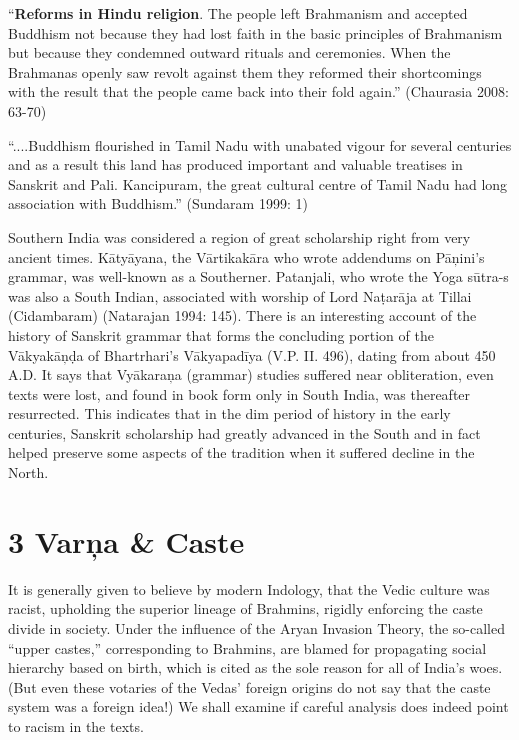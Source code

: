 \vskip 2pt

\begin{myquote}
“\textbf{Reforms in Hindu religion}. The people left Brahmanism and accepted Buddhism not because they had lost faith in the basic principles of Brahmanism but because they condemned outward rituals and ceremonies. When the Brahmanas openly saw revolt against them they reformed their shortcomings with the result that the people came back into their fold again.” (Chaurasia 2008: 63-70)
\end{myquote}

\vskip 2pt

\begin{myquote}
“....Buddhism flourished in Tamil Nadu with unabated vigour for several centuries and as a result this land has produced important and valuable treatises in Sanskrit and Pali. Kancipuram, the great cultural centre of Tamil Nadu had long association with Buddhism.” (Sundaram 1999: 1)
\end{myquote}

\vskip 2pt

Southern India was considered a region of great scholarship right from very ancient times. Kātyāyana, the Vārtikakāra who wrote addendums on Pāņini’s grammar, was well-known as a Southerner. Patanjali, who wrote the Yoga sūtra-s was also a South Indian, associated with worship of Lord Naṭarāja at Tillai (Cidambaram) (Natarajan 1994: 145). There is an interesting account of the history of Sanskrit grammar that forms the concluding portion of the Vākyakāņḍa of Bhartrhari’s Vākyapadīya (V.P. II. 496), dating from about 450 A.D. It says that Vyākaraņa (grammar) studies suffered near obliteration, even texts were lost, and found in book form only in South India, was thereafter resurrected. This indicates that in the dim period of history in the early centuries, Sanskrit scholarship had greatly advanced in the South and in fact helped preserve some aspects of the tradition when it suffered decline in the North.

\vskip 2pt


\section*{3 Varņa \& Caste}

It is generally given to believe by modern Indology, that the Vedic culture was racist, upholding the superior lineage of Brahmins, rigidly enforcing the caste divide in society. Under the influence of the Aryan Invasion Theory, the so-called “upper castes,” corresponding to Brahmins, are blamed for propagating social hierarchy based on birth, which is cited as the sole reason for all of India’s woes. (But even these votaries of the Vedas’ foreign origins do not say that the caste system was a foreign idea!) We shall examine if careful analysis does indeed point to racism in the texts.

